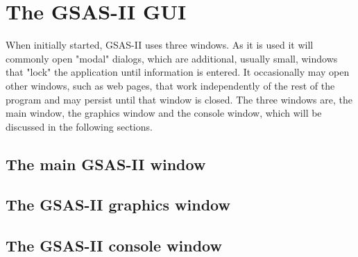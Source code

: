 \section{The GSAS-II GUI}
When initially started, GSAS-II uses three windows. As it is used it will commonly open  "modal" dialogs, which are additional, usually small, windows that "lock" the application until information is entered. It occasionally may open other windows, such as web pages, that work independently of the rest of the program and may persist until that window is closed. The three windows are, the main window, the graphics window and the console window, which will be discussed in the following sections. 
\subsection{The main GSAS-II window}

\subsection{The GSAS-II graphics window}
\subsection{The GSAS-II console window}